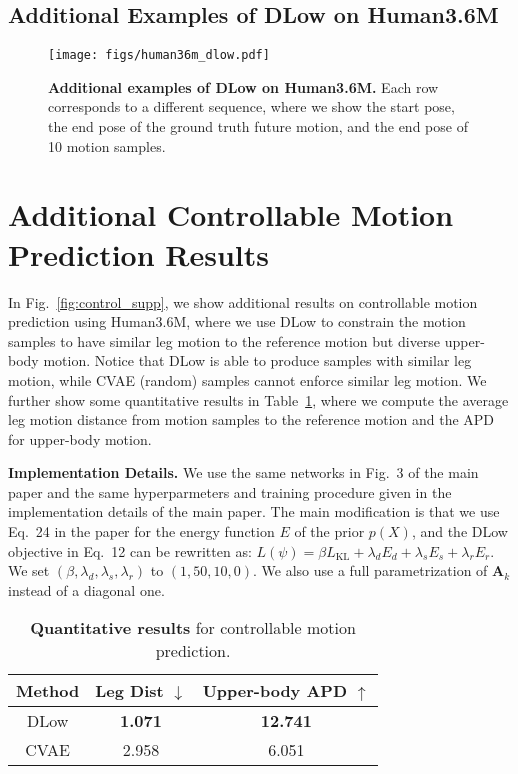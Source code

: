 \documentclass[runningheads]{llncs}
\begin{document}
\clearpage
\subsection{Additional Examples of DLow on Human3.6M}
\begin{figure}[ht!]
    \centering
    \texttt{[image: figs/human36m\_dlow.pdf]}
    \caption{\textbf{Additional examples of DLow on Human3.6M.} Each row corresponds to a different sequence, where we show the start pose, the end pose of the ground truth future motion, and the end pose of 10 motion samples.}
    \label{fig:supp_h36m}
\end{figure}

\clearpage
\section{Additional Controllable Motion Prediction Results}
\label{sec:control_res}
In Fig.~\ref{fig:control_supp}, we show additional results on controllable motion prediction using Human3.6M, where we use DLow to constrain the motion samples to have similar leg motion to the reference motion but diverse upper-body motion. Notice that DLow is able to produce samples with similar leg motion, while CVAE (random) samples cannot enforce similar leg motion. We further show some quantitative results in Table~\ref{table:control}, where we compute the average leg motion distance from motion samples to the reference motion and the APD for upper-body motion.

\vspace{1mm}\noindent\textbf{Implementation Details.}
We use the same networks in Fig.~3 of the main paper and the same hyperparmeters and training procedure given in the implementation details of the main paper. The main modification is that we use Eq.~24 in the paper for the energy function $E$ of the prior $p(X)$, and the DLow objective in Eq.~12 can be rewritten as: $L(\psi) = \beta L_\text{KL} + \lambda_d E_d + \lambda_s E_s + \lambda_r E_r$. We set $(\beta, \lambda_d, \lambda_s, \lambda_r)$ to $(1, 50, 10, 0)$. We also use a full parametrization of $\mathbf{A}_k$ instead of a diagonal one.

\begin{table}[ht!]
\footnotesize
\centering
\vspace{-5mm}
\begin{tabular}{c@{\hskip 2mm}c@{\hskip 2mm}c}
\toprule
Method & Leg Dist $\downarrow$ & Upper-body APD $\uparrow$ \\ \midrule
DLow & \textbf{1.071} & \textbf{12.741} \\  
CVAE & 2.958 & 6.051 \\  
\bottomrule
\end{tabular}
\vspace{2mm}
\caption{\textbf{Quantitative results} for controllable motion prediction.}
\label{table:control}
\vspace{-10mm}
\end{table}
\end{document}
